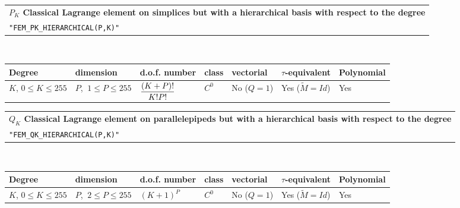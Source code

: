 \documentclass[10pt,a4paper]{article}
\begin{document}
\begin{center}
\begin{tabular}{|m{16.109cm}|} \hline 
{\bf $P_{K}$ Classical Lagrange element on simplices but with a hierarchical basis with respect to the degree}\\
{\tt "FEM\_PK\_HIERARCHICAL(P,K)"} 
\end{tabular} \\ \vspace{-1pt} 
\begin{tabular}{|m{2cm}|m{2cm}|m{2.5cm}|m{1.5cm}|m{1.5cm}|m{2cm}|m{2cm}|} \hline 
Degree & dimension & d.o.f. number & class & vectorial & \mbox{$\tau$-equivalent} & Polynomial\\ \hline
\small \mbox{$K$}, \small \mbox{$0 \leq K\leq 255$} & \small $P$, \mbox{$\ 1 \leq P \leq 255$} & \mbox{${\displaystyle \frac{\displaystyle (K+P)!}{\displaystyle K! P!}}$} & $C^0$ & No \mbox{($Q = 1$)} & Yes \mbox{($\tilde{M} = Id$)}  & Yes\\ \hline
\end{tabular}
\end{center}

\begin{center}
\begin{tabular}{|m{16.109cm}|} \hline 
{\bf $Q_{K}$ Classical Lagrange element on parallelepipeds but with a hierarchical basis with respect to the degree}\\
{\tt "FEM\_QK\_HIERARCHICAL(P,K)"} 
\end{tabular} \\ \vspace{-1pt} 
\begin{tabular}{|m{2cm}|m{2cm}|m{2.5cm}|m{1.5cm}|m{1.5cm}|m{2cm}|m{2cm}|} \hline 
Degree & dimension & d.o.f. number & class & vectorial & \mbox{$\tau$-equivalent} & Polynomial\\ \hline
\small \mbox{$K$}, \small \mbox{$0 \leq K\leq 255$} & \small $P$, \mbox{$\ 2 \leq P \leq 255$} & \mbox{$(K+1)^P$} & $C^0$ & No \mbox{($Q = 1$)} & Yes \mbox{($\tilde{M} = Id$)}  & Yes\\ \hline
\end{tabular}
\end{center}
\end{document}
